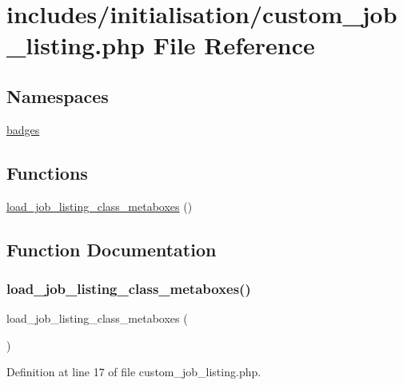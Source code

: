 \hypertarget{custom__job__listing_8php}{}\section{includes/initialisation/custom\+\_\+job\+\_\+listing.php File Reference}
\label{custom__job__listing_8php}
\subsection*{Namespaces}
\begin{DoxyCompactItemize}
\item 
 \hyperlink{namespacebadges}{badges}
\end{DoxyCompactItemize}
\subsection*{Functions}
\begin{DoxyCompactItemize}
\item 
\hyperlink{custom__job__listing_8php_aa31e0f64d35843b032f8df7b27fae672}{load\+\_\+job\+\_\+listing\+\_\+class\+\_\+metaboxes} ()
\end{DoxyCompactItemize}


\subsection{Function Documentation}
\mbox{\label{custom__job__listing_8php_aa31e0f64d35843b032f8df7b27fae672}} 
\subsubsection{\texorpdfstring{load\+\_\+job\+\_\+listing\+\_\+class\+\_\+metaboxes()}{load\_job\_listing\_class\_metaboxes()}}
{\footnotesize\ttfamily load\+\_\+job\+\_\+listing\+\_\+class\+\_\+metaboxes (\begin{DoxyParamCaption}{ }\end{DoxyParamCaption})}



Definition at line 17 of file custom\+\_\+job\+\_\+listing.\+php.

